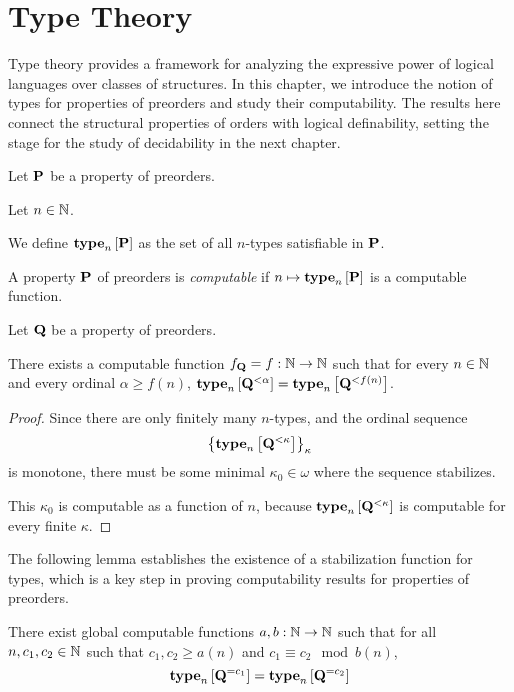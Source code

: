 \section{Type Theory}

Type theory provides a framework for analyzing the expressive power of logical languages over classes of structures. In this chapter, we introduce the notion of types for properties of preorders and study their computability. The results here connect the structural properties of orders with logical definability, setting the stage for the study of decidability in the next chapter.

\begin{definition}
    Let $\mathbf{P}$ be a property of preorders.

    Let $n \in \mathbb{N}$.

    We define $\mathbf{type}_{n} \left[ {\mathbf{P}} \right]$ as the set of all
    $n$-types satisfiable in $\mathbf{P}$.
\end{definition}

\begin{definition}
    A property $\mathbf{P}$ of preorders is \emph{computable} if
    $n \mapsto \mathbf{type}_{n} \left[ {\mathbf{P}} \right]$ is a computable function.
\end{definition}

\begin{lemma}\label{f-lemma}
    Let $\mathbf{Q}$ be a property of preorders.

    There exists a computable function $f_{\mathbf{Q}} = f: \mathbb{N} \to \mathbb{N}$ such that
    for every $n \in \mathbb{N}$ and every ordinal $\alpha \ge f(n)$,
    $\mathbf{type}_{n} \left[ {\mathbf{Q}^{< \alpha}} \right] = \mathbf{type}_{n} \left[ {\mathbf{Q}^{< f(n)}} \right]$.
\end{lemma}

\begin{proof}
    Since there are only finitely many $n$-types,
    and the ordinal sequence \[\left\{ {\mathbf{type}_{n} \left[ {\mathbf{Q}^{< \kappa}} \right]} \right\}_{\kappa}\]
    is monotone,
    there must be some minimal $\kappa_0 \in \omega$ where the sequence stabilizes.

    This $\kappa_0$ is computable as a function of $n$, because
    $\mathbf{type}_{n} \left[ {\mathbf{Q}^{< \kappa}} \right]$ is computable for every finite $\kappa$.
\end{proof}

The following lemma establishes the existence of a stabilization function for types, which is a key step in proving
computability results for properties of preorders.

\begin{lemma}\label{ab-lemma}
    There exist global computable functions $a, b : \mathbb{N} \to \mathbb{N}$ such that
    for all $n, c_1, c_2 \in \mathbb{N}$ such that $c_1, c_2 \ge a(n)$ and $c_1 \equiv c_2 \mod b(n)$,
    \[\mathbf{type}_{n} \left[ {\mathbf{Q}^{= c_1}} \right] = \mathbf{type}_{n} \left[ {\mathbf{Q}^{= c_2}} \right]\]
\end{lemma}

